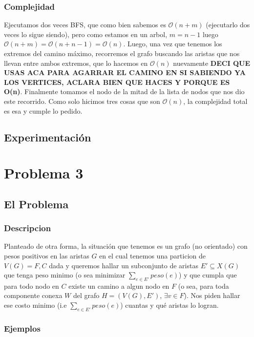 \documentclass[A4paper,oneside,fleqn,11pt]{article}
\theoremstyle{definition}
\begin{document}
\subsubsection{Complejidad}

Ejecutamos dos veces BFS, que como bien sabemos es $\mathcal{O} (n+m)$ (ejecutarlo dos veces lo sigue siendo), pero como estamos en un arbol, $m=n-1$ luego $\mathcal{O} (n+m) =\mathcal{O} (n+n-1)=\mathcal{O} (n)$. Luego, una vez que tenemos los extremos del camino máximo, recorremos el grafo buscando las aristas que nos llevan entre ambos extremos, que lo hacemos en $\mathcal{O} (n)$ nuevamente \textbf{DECI QUE USAS ACA PARA AGARRAR EL CAMINO EN SI SABIENDO YA LOS VERTICES, ACLARA BIEN QUE HACES Y PORQUE ES O(n)}. Finalmente tomamos el nodo de la mitad de la lista de nodos que nos dio este recorrido. Como solo hicimos tres cosas que son $\mathcal{O} (n)$, la complejidad total es esa y cumple lo pedido.

\subsection{Experimentación}

\section{Problema 3}

\subsection{El Problema}

\subsubsection{Descripcion}
Planteado de otra forma, la situación que tenemos es un grafo (no orientado) con pesos positivos en las aristas $G$ en el cual tenemos una particion de $V(G)={F,C}$ dada y queremos hallar un subconjunto de aristas $E' \subseteq X(G)$ que tenga peso minimo (o sea minimizar $\sum_{e \in E'} {peso(e)}$) y que cumpla que para todo nodo en $C$ existe un camino a algun nodo en $F$ (o sea, para toda componente conexa $W$ del  grafo $H=(V(G),E')$,  $\exists v \in F$). Nos piden hallar ese costo minimo (i.e $\sum_{e \in E'} {peso(e)}$) cuantas y qué aristas lo logran.
\subsubsection{Ejemplos}
\end{document}
